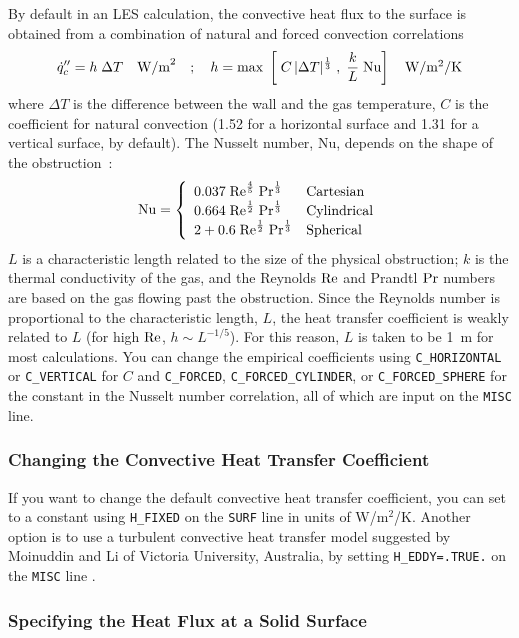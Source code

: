 \documentclass[11pt]{book}
\newcommand{\ct}{\tt\small}
\newcommand{\dq}{\dot{q}}
\newcommand{\ha}{\frac{1}{2}}
\newcommand{\ot}{\frac{1}{3}}
\newcommand{\fofi}{\frac{4}{5}}
\newcommand{\be}{\begin{equation}}
\newcommand{\ee}{\end{equation}}
\newcommand{\RE}{\hbox{Re}}
\newcommand{\PR}{\hbox{Pr}}
\newcommand{\NU}{\hbox{Nu}}
\begin{document}
By default in an LES calculation, the convective heat flux to the surface is
obtained from a combination of natural and forced
convection correlations
\be \dq_c'' = h \; \Delta T
    \quad \hbox{W/m}^2 \quad ; \quad h =
    \max \; \left[ \; C \, |\Delta T|^\ot \; , \;
            \frac{k}{L} \; \NU
            \right]  \quad
    \hbox{W/m$^2$/K} \ee
where $\Delta T$ is the difference between the wall and the gas temperature,
$C$ is the coefficient for natural convection (1.52 for a horizontal surface
and 1.31 for a vertical surface, by default). The Nusselt number, Nu, depends on the shape of the obstruction~\cite{Holman:1}:
\be \NU = \left\{ \begin{array}{ll} 0.037 \; \RE^\fofi \; \PR^\ot & \hbox{Cartesian} \\
                                    0.664 \; \RE^\ha \; \PR^\ot & \hbox{Cylindrical} \\
                                    2 + 0.6 \; \RE^\ha \; \PR^\ot & \hbox{Spherical} \end{array} \right. \ee
$L$ is a characteristic length related to the size of the physical
obstruction; $k$ is the thermal conductivity of the
gas, and the Reynolds $\RE$ and Prandtl $\PR$ numbers are based on the
gas flowing past the obstruction. Since the Reynolds number is proportional to the
characteristic length, $L$, the heat transfer coefficient is weakly
related to $L$ (for high $\RE$, $h \sim L^{-1/5}$). For this reason, $L$ is taken to be 1~m for most
calculations. You can change the empirical coefficients using {\ct C\_HORIZONTAL} or {\ct C\_VERTICAL} for $C$ and
{\ct C\_FORCED}, {\ct C\_FORCED\_CYLINDER}, or {\ct C\_FORCED\_SPHERE} for the constant in the Nusselt number correlation, all of which are input on the {\ct MISC} line.

\subsubsection{Changing the Convective Heat Transfer Coefficient}

If you want to change the default convective heat transfer coefficient, you can set to a constant using
{\ct H\_FIXED} on the {\ct SURF} line in units of W/m$^2$/K. Another option is to use a turbulent
convective heat transfer model suggested by Moinuddin and Li of Victoria University, Australia, by setting
{\ct H\_EDDY=.TRUE.} on the {\ct MISC} line \cite{Moinuddin:2010}.

\subsubsection{Specifying the Heat Flux at a Solid Surface}
\end{document}
